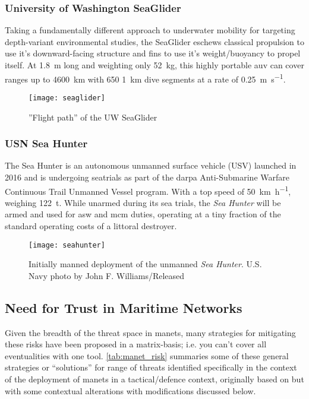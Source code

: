\subsubsection{University of Washington SeaGlider}
Taking a fundamentally different approach to underwater mobility for targeting depth-variant environmental studies, the SeaGlider eschews classical propulsion to use it's downward-facing structure and fins to use it's weight/buoyancy to propel itself.   
At \SI{1.8}{\meter} long and weighting only \SI{52}{\kilogram}, this highly portable \gls{auv} can cover ranges up to \SI{4600}{\kilo\meter} with 650 \SI{1}{\kilo\meter} dive segments at a rate of \SI{0.25}{\meter\per\second}.
\begin{figure}[h]
	\centering
	\texttt{[image: seaglider]}
	\caption{\label{fig:seaglider}''Flight path'' of the UW SeaGlider}
\end{figure}

\subsubsection{USN Sea Hunter}
The Sea Hunter is an autonomous unmanned surface vehicle (USV) launched in 2016 and is undergoing seatrials as part of the \gls{darpa} Anti-Submarine Warfare Continuous Trail Unmanned Vessel program. With a top speed of \SI{50}{\km\per\hour}, weighing \SI{122}{\tonne}.
While unarmed during its sea trials, the \emph{Sea Hunter} will be armed and used for \gls{asw} and \gls{mcm} duties, operating at a tiny fraction of the standard operating costs of a littoral destroyer.
\begin{figure}[h]
	\centering
	\texttt{[image: seahunter]}
	\caption{\label{fig:seaglider}Initially manned deployment of the unmanned \emph{Sea Hunter}. U.S. Navy photo by John F. Williams/Released}
\end{figure}

\subsection{Need for Trust in Maritime Networks}\label{sec:trust_in_marine}


Given the breadth of the threat space in \glspl{manet}, many strategies for mitigating these risks have been proposed in a matrix-basis; i.e. you can't cover all eventualities with one tool.
\autoref{tab:manet_risk} summaries some of these general strategies or ``solutions'' for range of threats identified specifically in the context of the deployment of \glspl{manet} in a tactical/defence context, originally based on \citet{Kidston2010} but with some contextual alterations with modifications discussed below.

